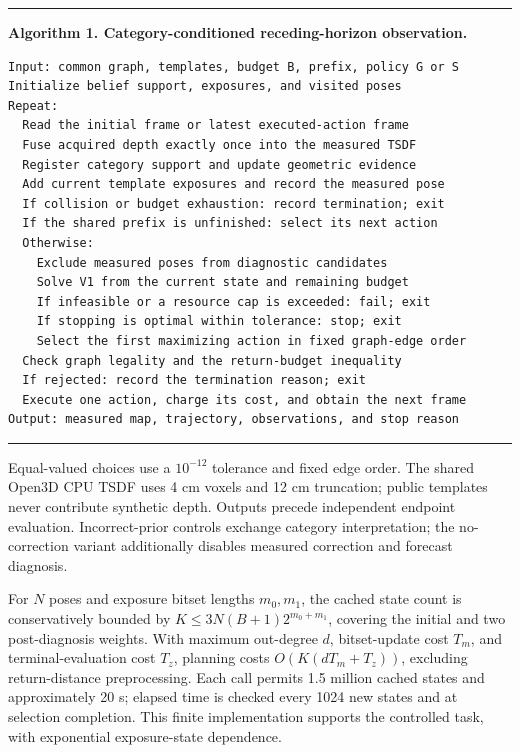 \documentclass[11pt,a4paper]{article}
\begin{document}
\par\medskip\noindent\begin{minipage}{\linewidth}
\small\hrule\vspace{0.6em}
\textbf{Algorithm 1. Category-conditioned receding-horizon observation.}

\begin{verbatim}
Input: common graph, templates, budget B, prefix, policy G or S
Initialize belief support, exposures, and visited poses
Repeat:
  Read the initial frame or latest executed-action frame
  Fuse acquired depth exactly once into the measured TSDF
  Register category support and update geometric evidence
  Add current template exposures and record the measured pose
  If collision or budget exhaustion: record termination; exit
  If the shared prefix is unfinished: select its next action
  Otherwise:
    Exclude measured poses from diagnostic candidates
    Solve V1 from the current state and remaining budget
    If infeasible or a resource cap is exceeded: fail; exit
    If stopping is optimal within tolerance: stop; exit
    Select the first maximizing action in fixed graph-edge order
  Check graph legality and the return-budget inequality
  If rejected: record the termination reason; exit
  Execute one action, charge its cost, and obtain the next frame
Output: measured map, trajectory, observations, and stop reason
\end{verbatim}
\vspace{0.4em}\hrule
\end{minipage}\par\medskip


Equal-valued choices use a \(10^{-12}\) tolerance and fixed edge order. The shared Open3D CPU TSDF \cite{ref4,ref11} uses 4 cm voxels and 12 cm truncation; public templates never contribute synthetic depth. Outputs precede independent endpoint evaluation. Incorrect-prior controls exchange category interpretation; the no-correction variant additionally disables measured correction and forecast diagnosis.

For \(N\) poses and exposure bitset lengths \(m_0,m_1\), the cached state count is conservatively bounded by \(K\le3N(B+1)2^{m_0+m_1}\), covering the initial and two post-diagnosis weights. With maximum out-degree \(d\), bitset-update cost \(T_m\), and terminal-evaluation cost \(T_z\), planning costs \(O(K(dT_m+T_z))\), excluding return-distance preprocessing. Each call permits 1.5 million cached states and approximately 20 s; elapsed time is checked every 1024 new states and at selection completion. This finite implementation supports the controlled task, with exponential exposure-state dependence.
\end{document}
